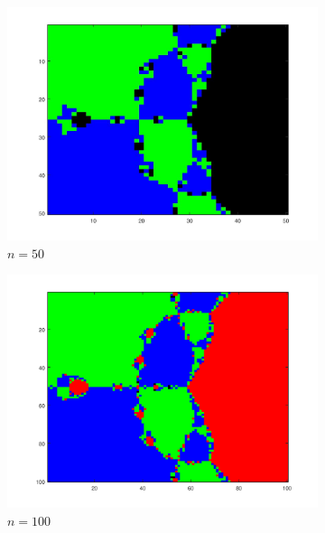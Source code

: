 \documentclass[paper=a4, fontsize=11pt]{scrartcl}
\begin{document}
\begin{figure}[htb]
\centering
\begin{subfigure}{0.25\textwidth}
	\includegraphics[width=\linewidth]{fractal_50}
	\caption{$n=50$}
\end{subfigure}\hfil %
\begin{subfigure}{0.25\textwidth}
	\includegraphics[width=\linewidth]{fractal_100}
	\caption{$n=100$}
\end{subfigure}\hfil %
\begin{subfigure}{0.25\textwidth}

\end{subfigure}
\end{figure}
\end{document}
